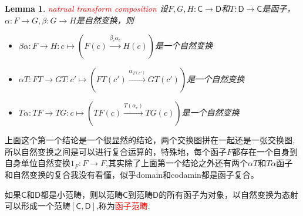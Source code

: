 \documentclass{article}
\newtheorem{lemma}[theorem]{Lemma}
\newcommand*{\cat}[1]{\textsf{#1}\xspace}
\newcommand{\redt}[1]{\textcolor{red}{#1}}
\begin{document}
\begin{lemma}
\rm \redt{natrual transform composition} 设$F,G,H \colon \cat{C} \rightarrow \cat{D}$和$T \colon \cat{D} \rightarrow \cat{C}$是函子，$\alpha \colon F \rightarrow G, \beta \colon G \rightarrow H$是自然变换，则
\begin{itemize}
 \item $\beta\alpha \colon F \rightarrow H \colon c \mapsto(F(c) \xrightarrow{\beta_c\alpha_c} H(c))$是一个自然变换
 \begin{center}
 \end{center}
	\item $\alpha T \colon FT \rightarrow GT \colon c' \mapsto (FT(c') \xrightarrow{\alpha_{T(c')}} GT(c'))$是一个自然变换
	\item $T\alpha \colon TF \rightarrow TG \colon c \mapsto (TF(c) \xrightarrow{T(\alpha_{c})} TG(c))$是一个自然变换
\end{itemize}
\end{lemma}


上面这个第一个结论是一个很显然的结论，两个交换图拼在一起还是一张交换图,所以自然变换之间是可以进行复合运算的，特殊地，每个函子$F$都存在一个自身到自身单位自然变换$1_F \colon F \rightarrow F$,其实除了上面第一个结论之外还有两个$\alpha T$和$T\alpha$函子和自然变换的复合我没有看懂，似乎domain和codamin都是函子复合。

如果$\cat{C}$和$\cat{D}$都是小范畴，则以范畴$\cat{C}$到范畴$\cat{D}$的所有函子为对象，以自然变换为态射可以形成一个范畴$[\cat{C},\cat{D}]$,称为\redt{函子范畴}. 
\end{document}
